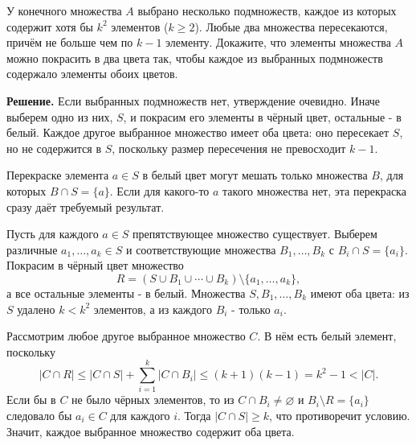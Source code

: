 \begin{problems}
\item У конечного множества $A$ выбрано несколько подмножеств, каждое из которых содержит хотя бы $k^2$ элементов ($k\ge2$). Любые два множества пересекаются, причём не больше чем по $k-1$ элементу. Докажите, что элементы множества $A$ можно покрасить в два цвета так, чтобы каждое из выбранных подмножеств содержало элементы обоих цветов.
\par\smallskip\noindent\textbf{Решение.} Если выбранных подмножеств нет, утверждение очевидно. Иначе выберем одно из них, $S$, и покрасим его элементы в чёрный цвет, остальные - в белый. Каждое другое выбранное множество имеет оба цвета: оно пересекает $S$, но не содержится в $S$, поскольку размер пересечения не превосходит $k-1$.
\par Перекраске элемента $a\in S$ в белый цвет могут мешать только множества $B$, для которых $B\cap S=\{a\}$. Если для какого-то $a$ такого множества нет, эта перекраска сразу даёт требуемый результат.
\par Пусть для каждого $a\in S$ препятствующее множество существует. Выберем различные $a_1,\ldots,a_k\in S$ и соответствующие множества $B_1,\ldots,B_k$ с $B_i\cap S=\{a_i\}$. Покрасим в чёрный цвет множество
\[
R=(S\cup B_1\cup\cdots\cup B_k)\setminus\{a_1,\ldots,a_k\},
\]
а все остальные элементы - в белый. Множества $S,B_1,\ldots,B_k$ имеют оба цвета: из $S$ удалено $k<k^2$ элементов, а из каждого $B_i$ - только $a_i$.
\par Рассмотрим любое другое выбранное множество $C$. В нём есть белый элемент, поскольку
\[
|C\cap R|\le |C\cap S|+\sum_{i=1}^{k}|C\cap B_i|
\le(k+1)(k-1)=k^2-1<|C|.
\]
Если бы в $C$ не было чёрных элементов, то из $C\cap B_i\ne\varnothing$ и $B_i\setminus R=\{a_i\}$ следовало бы $a_i\in C$ для каждого $i$. Тогда $|C\cap S|\ge k$, что противоречит условию. Значит, каждое выбранное множество содержит оба цвета.\par


\end{problems}
